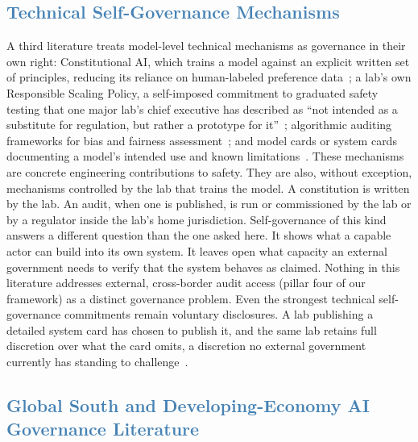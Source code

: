 \documentclass[journal]{IEEEtran}
\begin{document}
\subsection{\textcolor{steelblue}{Technical Self-Governance Mechanisms}}

A third literature treats model-level technical mechanisms as governance in their own right: Constitutional AI, which trains a model against an explicit written set of principles, reducing its reliance on human-labeled preference data~\cite{bai2022constitutional};
a lab's own Responsible Scaling Policy, a self-imposed commitment to graduated safety testing that one major lab's chief executive has described as ``not intended as a substitute for regulation, but rather a prototype for it''~\cite{amodei2023bletchley};
algorithmic auditing frameworks for bias and fairness assessment~\cite{raji2020closing,buolamwini2018gender,wachter2021bias};
and model cards or system cards documenting a model's intended use and known limitations~\cite{mitchell2019modelcards}.
These mechanisms are concrete engineering contributions to safety. They are also, without exception, mechanisms controlled by the lab that trains the model. A constitution is written by the lab. An audit, when one is published, is run or commissioned by the lab or by a regulator inside the lab's home jurisdiction. Self-governance of this kind answers a different question than the one asked here. It shows what a capable actor can build into its own system. It leaves open what capacity an external government needs to verify that the system behaves as claimed. Nothing in this literature addresses external, cross-border audit access (pillar four of our framework) as a distinct governance problem. Even the strongest technical self-governance commitments remain voluntary disclosures. A lab publishing a detailed system card has chosen to publish it, and the same lab retains full discretion over what the card omits, a discretion no external government currently has standing to challenge~\cite{mitchell2019modelcards}.

\subsection{\textcolor{steelblue}{Global South and Developing-Economy AI Governance Literature}}
\end{document}
